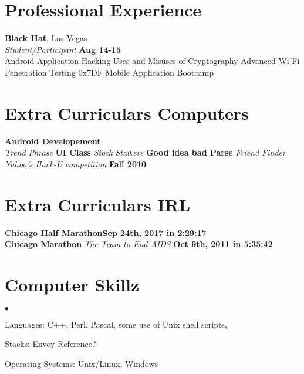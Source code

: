 \documentclass[margin,line]{res}
\newenvironment{list2}{
  \begin{list}{$\bullet$}{
      \setlength{\itemsep}{0in}
      \setlength{\parsep}{0in} \setlength{\parskip}{0in}
      \setlength{\topsep}{0in} \setlength{\partopsep}{0in} 
      \setlength{\leftmargin}{0.2in}}}{\end{list}}
\begin{document}
\begin{resume}

\section{\sc Professional Experience}

{\bf {Black Hat}}, {Las Vegas}\\
{\em Student/Participant } \hfill {\bf Aug 14-15}\\
Android Application Hacking
Uses and Misuses of Cryptography
Advanced Wi-Fi Penetration Testing
0x7DF Mobile Application Bootcamp

\section{\sc Extra Curriculars Computers}
{\bf Android Developement }\\
{\em Trend Phrase} \hfill {\bf  UI Class}
{\em Stock Stalkers} \hfill {\bf Good idea bad Parse}
{\em Friend Finder Yahoo’s Hack-U competition} \hfill {\bf Fall 2010} 


\section{\sc Extra Curriculars IRL}

{\bf Chicago Half Marathon}\hfill {\bf  Sep 24th, 2017 in 2:29:17 }\\

{\bf Chicago Marathon},{\em  The Team to End AIDS} \hfill {\bf  Oct 9th, 2011 in 5:35:42}\\


\section{\sc Computer Skillz} 
\begin{list2}
\item Languages:  C++, Perl, Pascal, some use of Unix shell scripts,
\item Stacks: Envoy Reference?
\item Operating Systems:  Unix/Linux, Windows
\end{list2}


\end{resume}
\end{document}
